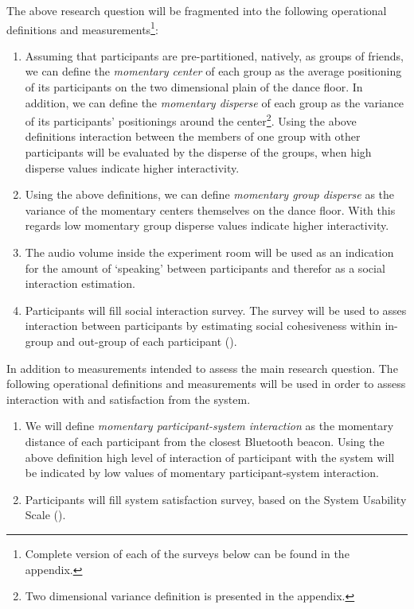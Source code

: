 \documentclass[a4paper,11pt]{article}
\newcommand{\definition}[1]{\emph{#1}}
\begin{document}
The above research question will be fragmented into the following operational definitions and measurements\footnote{Complete version of each of the surveys below can be found in the appendix.}:
\begin{enumerate}
	\item \label{measure:disperse} Assuming that participants are pre-partitioned, natively, as groups of friends, we can define the \definition{momentary center} of each group as the average positioning of its participants on the two dimensional plain of the dance floor.
	In addition, we can define the \definition{momentary disperse} of each group as the variance of its participants' positionings around the center\footnote{Two dimensional variance definition is presented in the appendix.}.
	Using the above definitions interaction between the members of one group with other participants will be evaluated by the disperse of the groups, when high disperse values indicate higher interactivity.
	\item \label{measure:groups} Using the above definitions, we can define \definition{momentary group disperse} as the variance of the momentary centers themselves on the dance floor.
	With this regards low momentary group disperse values indicate higher interactivity.
	\item \label{measure:audio} The audio volume inside the experiment room will be used as an indication for the amount of `speaking' between participants and therefor as a social interaction estimation.
	\item \label{measure:survey:social} Participants will fill social interaction survey.
	The survey will be used to asses interaction between participants by estimating social cohesiveness within in-group and out-group of each participant ().
\end{enumerate}
In addition to measurements intended to assess the main research question.
The following operational definitions and measurements will be used in order to assess interaction with and satisfaction from the system.
\begin{enumerate}[resume]
	\item \label{measure:system} We will define \definition{momentary participant-system interaction} as the momentary distance of each participant from the closest Bluetooth beacon.
	Using the above definition high level of interaction of participant with the system will be indicated by low values of momentary participant-system interaction.
	\item \label{measure:survey:usability} Participants will fill system satisfaction survey, based on the System Usability Scale (\cite{brooke96}).
\end{enumerate}
\end{document}
